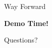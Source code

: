 \begin{frame}[t]{Way Forward}{}


  \textbf{Demo Time!}

  \vspace{0.5cm}
  Questions?

\end{frame}
